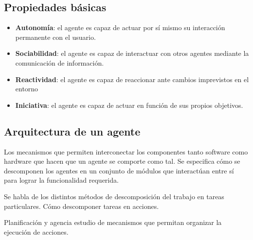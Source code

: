 \documentclass[12pt, twoside, openright]{report} %
\begin{document}
\subsection{Propiedades básicas}
\begin{itemize}
	\item \textbf{Autonomía}: el agente es capaz de actuar por sí mismo su interacción permanente con el usuario.
	\item \textbf{Sociabilidad}: el agente es capaz de interactuar con otros agentes mediante la comunicación de información.
	\item \textbf{Reactividad}: el agente es capaz de reaccionar ante cambios imprevistos en el entorno
	\item \textbf{Iniciativa}: el agente es capaz de actuar en función de sus propios objetivos.
\end{itemize}

\subsection{Arquitectura de un agente}
Los mecanismos que permiten interconectar los componentes tanto software como hardware que hacen que un agente se comporte como tal. Se especifica cómo se descomponen los agentes en un conjunto de módulos que interactúan entre sí para lograr la funcionalidad requerida. 

Se habla de los distintos métodos de descomposición del trabajo en tareas particulares. Cómo descomponer tareas en acciones. 

Planificación y agencia estudio de mecanismos que permitan organizar la ejecución de acciones.
\end{document}
